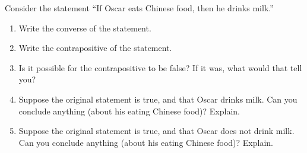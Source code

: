 \documentclass[11pt,]{book}
\theoremstyle{ptxplainnotitle}
\theoremstyle{ptxplaintitle}
\theoremstyle{ptxdefinitionnotitle}
\theoremstyle{ptxdefinitiontitle}
\theoremstyle{ptxdefinitionnotitle}
\theoremstyle{ptxdefinitiontitle}
\theoremstyle{ptxdefinitionnotitle}
\theoremstyle{ptxdefinitiontitle}
\theoremstyle{ptxdefinitiontitlenonumber}
\theoremstyle{ptxdefinitiontitlenonumber}
\numberwithin{equation}{chapter}
\begin{document}
\begin{divisionexercise}{9}\hypertarget{exercise-158}{}
\hypertarget{p-2111}{}%
Consider the statement ``If Oscar eats Chinese food, then he drinks milk.'' \leavevmode%
\begin{enumerate}[label=(\alph*)]
\item\hypertarget{li-1046}{}\hypertarget{p-2112}{}%
Write the converse of the statement.%
\item\hypertarget{li-1047}{}\hypertarget{p-2113}{}%
Write the contrapositive of the statement.%
\item\hypertarget{li-1048}{}\hypertarget{p-2114}{}%
Is it possible for the contrapositive to be false? If it was, what would that tell you?%
\item\hypertarget{li-1049}{}\hypertarget{p-2115}{}%
Suppose the original statement is true, and that Oscar drinks milk. Can you conclude anything (about his eating Chinese food)? Explain.%
\item\hypertarget{li-1050}{}\hypertarget{p-2116}{}%
Suppose the original statement is true, and that Oscar does not drink milk. Can you conclude anything (about his eating Chinese food)? Explain.%
\end{enumerate}
%
\end{divisionexercise}%
\end{document}
